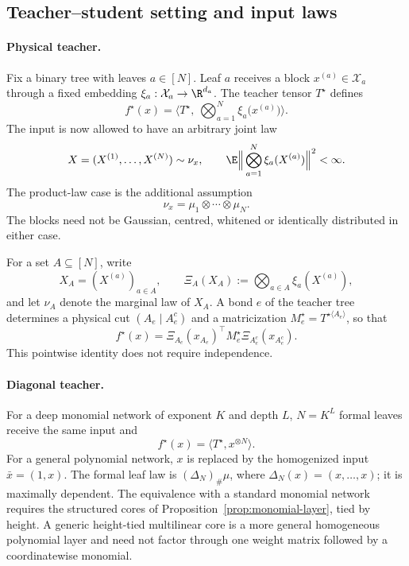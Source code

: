 \subsection{Teacher--student setting and input laws}\label{sec:compare-setting}

\paragraph{Physical teacher.}
Fix a binary tree with leaves $a\in[N]$.  Leaf $a$ receives a block $x^{(a)}\in\mathcal X_a$
through a fixed embedding $\xi_a:\mathcal X_a\to\R^{d_a}$.  The teacher tensor $T^\star$ defines
\begin{equation}\label{eq:teacher}
 f^\star(x)=\Big\langle T^\star,\ \bigotimes_{a=1}^N\xi_a\big(x^{(a)}\big)\Big\rangle .
\end{equation}
The input is now allowed to have an arbitrary joint law
\begin{equation}\label{eq:joint-blocks}
 X=(X^{(1)},\ldots,X^{(N)})\sim\nu_x,
 \qquad
 \E\Big\|\bigotimes_{a=1}^N\xi_a(X^{(a)})\Big\|^2<\infty .
\end{equation}
The product-law case is the additional assumption
\begin{equation}\label{eq:independent-blocks}
 \nu_x=\mu_1\otimes\cdots\otimes\mu_N .
\end{equation}
The blocks need not be Gaussian, centred, whitened or identically distributed in either case.

For a set $A\subseteq[N]$, write
\[
 X_A=(X^{(a)})_{a\in A},\qquad
 \Xi_A(X_A):=\bigotimes_{a\in A}\xi_a(X^{(a)}),
\]
and let $\nu_A$ denote the marginal law of $X_A$.  A bond $e$ of the teacher tree determines a
physical cut $(A_e\mid A_e^c)$ and a matricization $M_e^\star=T^{\star\langle A_e\rangle}$, so that
\begin{equation}\label{eq:teacher-cut}
 f^\star(x)=\Xi_{A_e}(x_{A_e})^\top M_e^\star\Xi_{A_e^c}(x_{A_e^c}).
\end{equation}
This pointwise identity does not require independence.

\paragraph{Diagonal teacher.}
For a deep monomial network of exponent $K$ and depth $L$, $N=K^L$ formal leaves receive the
same input and
\begin{equation}\label{eq:diagonal-teacher}
 f^\star(x)=\langle T^\star,x^{\otimes N}\rangle .
\end{equation}
For a general polynomial network, $x$ is replaced by the homogenized input $\bar x=(1,x)$.
The formal leaf law is $(\Delta_N)_\#\mu$, where $\Delta_N(x)=(x,\ldots,x)$; it is maximally
dependent.  The equivalence with a standard monomial network requires the structured cores of
Proposition~\ref{prop:monomial-layer}, tied by height.  A generic height-tied multilinear core is a
more general homogeneous polynomial layer and need not factor through one weight matrix followed
by a coordinatewise monomial.

